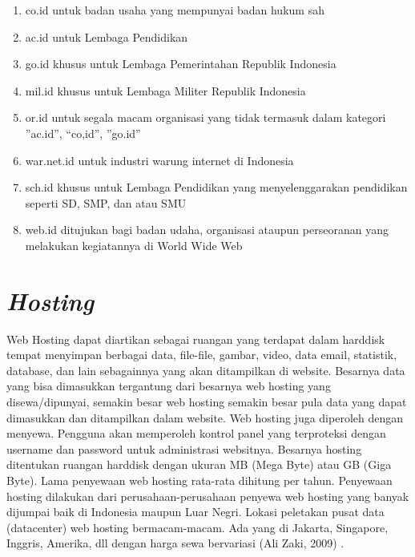 \begin{enumerate}
	\item co.id untuk badan usaha yang mempunyai badan hukum sah
	\item ac.id untuk Lembaga Pendidikan
	\item go.id khusus untuk Lembaga Pemerintahan Republik Indonesia
	\item mil.id khusus untuk Lembaga Militer Republik Indonesia
	\item or.id untuk segala macam organisasi yang tidak termasuk dalam kategori ”ac.id”, “co,id”, ”go.id”
	\item war.net.id untuk industri warung internet di Indonesia
	\item sch.id khusus untuk Lembaga Pendidikan yang menyelenggarakan pendidikan seperti SD, SMP, dan atau SMU
	\item web.id ditujukan bagi badan udaha, organisasi ataupun perseoranan yang melakukan kegiatannya di World Wide Web
\end{enumerate}

\section{\textit{Hosting}}

Web Hosting dapat diartikan sebagai ruangan yang terdapat dalam harddisk tempat menyimpan berbagai data, file-file, gambar, video, data email, statistik, database, dan lain sebagainnya yang akan ditampilkan di website. Besarnya data yang bisa dimasukkan tergantung dari besarnya web hosting yang disewa/dipunyai, semakin besar web hosting semakin besar pula data yang dapat dimasukkan dan ditampilkan dalam website. Web hosting juga diperoleh dengan menyewa. Pengguna akan memperoleh kontrol panel yang terproteksi dengan username dan password untuk administrasi websitnya. Besarnya hosting ditentukan ruangan harddisk dengan ukuran MB (Mega Byte) atau GB (Giga Byte). Lama penyewaan web hosting rata-rata dihitung per tahun. Penyewaan hosting dilakukan dari perusahaan-perusahaan penyewa web hosting yang banyak dijumpai baik di Indonesia maupun Luar Negri. Lokasi peletakan pusat data (datacenter) web hosting bermacam-macam. Ada yang di Jakarta, Singapore, Inggris, Amerika, dll dengan harga sewa bervariasi (Ali Zaki, 2009) \cite{7}. 
